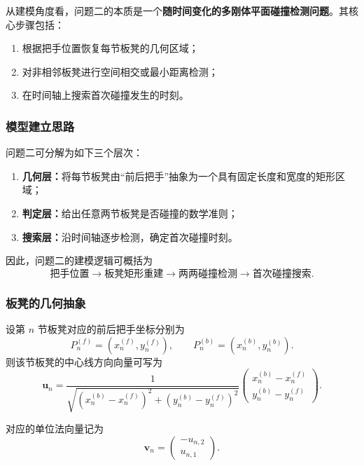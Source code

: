 \documentclass[12pt,a4paper]{ctexart}
\begin{document}
从建模角度看，问题二的本质是一个\textbf{随时间变化的多刚体平面碰撞检测问题}。其核心步骤包括：
\begin{enumerate}
    \item 根据把手位置恢复每节板凳的几何区域；
    \item 对非相邻板凳进行空间相交或最小距离检测；
    \item 在时间轴上搜索首次碰撞发生的时刻。
\end{enumerate}

\subsubsection{模型建立思路}
问题二可分解为如下三个层次：

\begin{enumerate}
    \item \textbf{几何层：}将每节板凳由“前后把手”抽象为一个具有固定长度和宽度的矩形区域；
    \item \textbf{判定层：}给出任意两节板凳是否碰撞的数学准则；
    \item \textbf{搜索层：}沿时间轴逐步检测，确定首次碰撞时刻。
\end{enumerate}

因此，问题二的建模逻辑可概括为
\[
\text{把手位置} \longrightarrow \text{板凳矩形重建} \longrightarrow \text{两两碰撞检测} \longrightarrow \text{首次碰撞搜索}.
\]

\subsubsection{板凳的几何抽象}
设第 $n$ 节板凳对应的前后把手坐标分别为
\[
P_n^{(f)}=(x_n^{(f)},y_n^{(f)}), \qquad
P_n^{(b)}=(x_n^{(b)},y_n^{(b)}).
\]
则该节板凳的中心线方向向量可写为
\begin{equation}
\bm{u}_n=
\frac{1}{\sqrt{\left(x_n^{(b)}-x_n^{(f)}\right)^2+\left(y_n^{(b)}-y_n^{(f)}\right)^2}}
\begin{pmatrix}
x_n^{(b)}-x_n^{(f)}\\
y_n^{(b)}-y_n^{(f)}
\end{pmatrix}.
\end{equation}

对应的单位法向量记为
\begin{equation}
\bm{v}_n=
\begin{pmatrix}
-u_{n,2}\\
u_{n,1}
\end{pmatrix}.
\end{equation}
\end{document}
